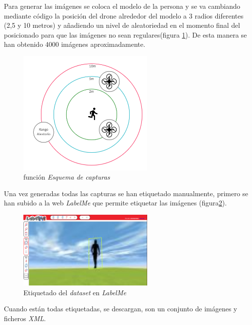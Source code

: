 Para generar las imágenes se coloca el modelo de la persona y se va cambiando mediante código la posición del drone alrededor del modelo a 3 radios diferentes (2,5 y 10 metros) y añadiendo un nivel de aleatoriedad en el momento final del posicionado para que las imágenes no sean regulares(figura \ref{fig:esquemaCapturas}).
De esta manera se han obtenido 4000 imágenes aproximadamente. 
\begin{figure}[H]
  \begin{center}
    \includegraphics[width=0.6\textwidth]{figures/simulado/capturas.png}
		\caption{función \textit{Esquema de capturas}}
		\label{fig:esquemaCapturas}
		\end{center}
\end{figure}
Una vez generadas todas las capturas se han etiquetado manualmente, primero se han subido a la web \textit{LabelMe} que permite etiquetar las imágenes (figura\ref{fig:datasetlabelme}).
\begin{figure}[H]
  \begin{center}
    \includegraphics[width=0.6\textwidth]{figures/herramientas/labelme.png}
		\caption{Etiquetado del \textit{dataset} en  \textit{LabelMe}}
		\label{fig:datasetlabelme}
		\end{center}
\end{figure}
Cuando están todas etiquetadas, se descargan, son un conjunto de imágenes y ficheros \textit{XML}.

